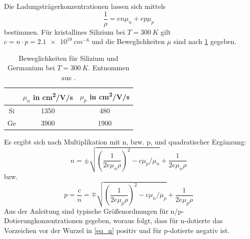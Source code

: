 \documentclass[
	a4paper,
	12pt,
	pagesize,
	ngerman
]{scrartcl}
\begin{document}
	Die Ladungsträgerkonzentrationen lassen sich mittels
	\begin{equation}
			\frac{1}{\rho}=en\mu_n + ep\mu_p
	\end{equation}
	bestimmen.
	Für kristallines Silizium bei $T=\SI{300}{K}$ gilt $c=n\cdot p=\SI{2.1e19}{cm^{-6}}$ und die Beweglichkeiten $\mu$ sind nach \cref{tb_beweg} gegeben.


	\begin{table}[H]
		\centering
		\begin{tabular}{c | c | c  }
			 &$\mu_n$ in \si{cm^2/V/s}&$\mu_p$ in \si{cm^2/V/s}\\ \hline
			 Si&1350&480 \\
			 Ge&3900&1900 \\
		\end{tabular}
		\caption{
		Beweglichkeiten für Silizium und Germanium bei $T=\SI{300}{K}$. Entnommen aus \cite{anleitung}.
		}
		\label{tb_beweg}
	\end{table}

	Es ergibt sich nach Multiplikation mit n, bzw. p, und quadratischer Ergänzung:
	\begin{equation}
		\label{eq_n}
			n =  \pm\sqrt{\left(\frac{1}{2e\mu_n\rho}\right)^2-c\mu_p/\mu_n}+\frac{1}{2e\mu_n \rho}
	\end{equation}
	bzw.
	\begin{equation}
			\label{eq_p}
			p =\frac{c}{n}=  \mp\sqrt{\left(\frac{1}{2e\mu_p\rho}\right)^2-c\mu_n/\mu_p}+\frac{1}{2e\mu_p \rho}
	\end{equation}
	Aus der Anleitung sind typische Größenordnungen für n/p-Dotierungkonzentrationen gegeben, woraus folgt, dass für n-dotierte das Vorzeichen vor der Wurzel in \cref{eq_n} positiv und für p-dotierte negativ ist.
\end{document}
